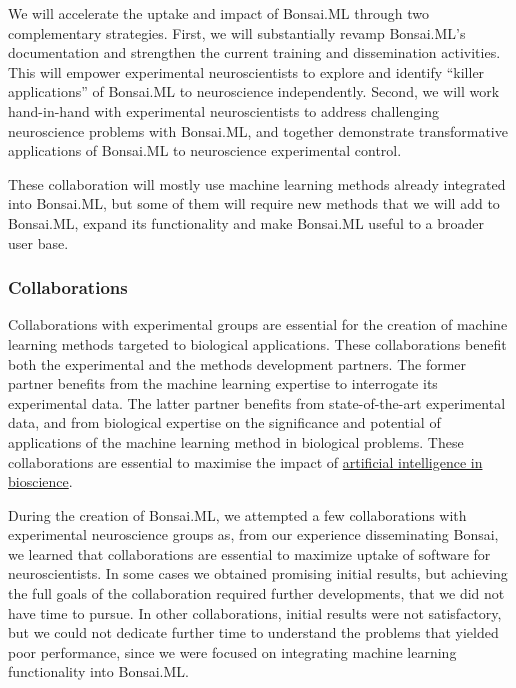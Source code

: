 We will accelerate the uptake and impact of Bonsai.ML through two complementary
strategies.
%
First, we will substantially revamp Bonsai.ML's documentation and strengthen
the current training and dissemination activities. This will empower
experimental neuroscientists to explore and identify ``killer applications'' of
Bonsai.ML to neuroscience independently.
%
Second, we will work hand-in-hand with experimental neuroscientists to address
challenging neuroscience problems with Bonsai.ML, and together demonstrate
transformative applications of Bonsai.ML to neuroscience experimental control.

%

These collaboration will mostly use machine learning methods already integrated
into Bonsai.ML, but some of them will require new methods that we will add to
Bonsai.ML, expand its functionality and make Bonsai.ML useful to a broader user
base.

\subsubsection{Collaborations}

Collaborations with experimental groups are essential for the creation of
machine learning methods targeted to biological applications. These
collaborations benefit both the experimental and the methods development
partners.
%
The former partner benefits from the machine learning expertise to interrogate its experimental data.
%
The latter partner benefits from state-of-the-art experimental
data, and from biological expertise on the significance and potential of applications of
the machine learning method in biological problems.
%
These collaborations are essential to maximise the impact of
\href{https://www.ukri.org/what-we-do/browse-our-areas-of-investment-and-support/artificial-intelligence-in-bioscience/}{artificial
intelligence in bioscience}.

During the creation of Bonsai.ML, we attempted a few collaborations with
experimental neuroscience groups as, from our experience disseminating Bonsai,
we learned that collaborations are essential to maximize uptake of software for
neuroscientists.
%
In some cases we obtained promising initial results, but achieving the full
goals of the collaboration required further developments, that we did not have
time to pursue.
%
In other collaborations, initial results were not satisfactory, but we could
not dedicate further time to understand the problems that yielded poor
performance, since we were focused on integrating machine learning
functionality into Bonsai.ML.

